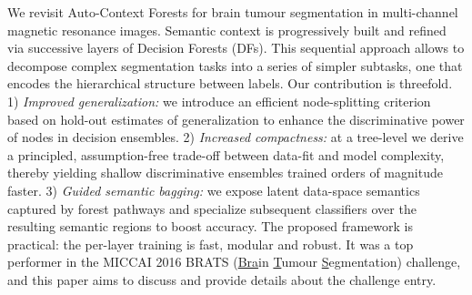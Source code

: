 
We revisit Auto-Context Forests for brain tumour segmentation in multi-channel magnetic resonance images. Semantic context is progressively built and refined via successive layers of Decision Forests (DFs). This sequential approach allows to decompose complex segmentation tasks into a series of simpler subtasks, \eg one that encodes the hierarchical structure between labels. Our contribution is threefold. 1) \textit{Improved generalization:} we introduce an efficient node-splitting criterion based on hold-out estimates of generalization to enhance the discriminative power of nodes in decision ensembles. 2) \textit{Increased compactness:} at a tree-level we derive a principled, assumption-free trade-off between data-fit and model complexity, thereby yielding shallow discriminative ensembles trained orders of magnitude faster. 3) \textit{Guided semantic bagging:} we expose latent data-space semantics captured by forest pathways and specialize subsequent classifiers over the resulting semantic regions to boost accuracy. The proposed framework is practical: the per-layer training is fast, modular and robust. It was a top performer in the MICCAI 2016 BRATS (\uline{Bra}in \uline{T}umour \uline{S}egmentation) challenge, and this paper aims to discuss and provide details about the challenge entry.
